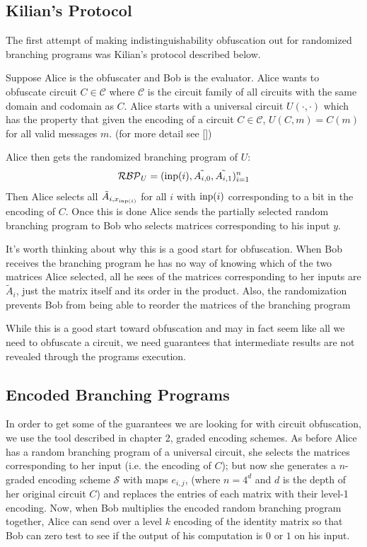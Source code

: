 \documentclass[12pt,twoside]{reedthesis}
\begin{document}
     \subsection{Kilian's Protocol}
     The first attempt of making indistinguishability obfuscation out for randomized branching programs was Kilian's protocol described below. 
     \par Suppose Alice is the obfuscater and Bob is the evaluator. Alice wants to obfuscate circuit $C\in \mathcal{C}$ where $\mathcal{C}$ is the circuit family of all circuits with the same domain and codomain as $C$. Alice starts with a universal circuit $U(\cdot, \cdot)$ which has the property that given the encoding of a circuit $C \in \mathcal{C}$, $U(C,m) = C(m)$ for all valid messages $m$. (for more detail see [\cite{Kilian:1988:FCO:62212.62215}])
     \par Alice then gets the randomized branching program of $U$:
     $$\mathcal{RBP}_U = (\text{inp}(i),\tilde{A_{i,0}},\tilde{A_{i,1}})_{i=1}^n$$
     Then Alice selects all $\tilde{A}_{i,x_{\text{inp}(i)}}$ for all $i$ with $\text{inp}(i)$ corresponding to a bit in the encoding of $C$. Once this is done Alice sends the partially selected random branching program to Bob who selects matrices corresponding to his input $y$. 
     \par It's worth thinking about why this is a good start for obfuscation. When Bob receives the branching program he has no way of knowing which of the two matrices Alice selected, all he sees of the matrices corresponding to her inputs are $\tilde{A}_i$, just the matrix itself and its order in the product. Also, the randomization prevents Bob from being able to reorder the matrices of the branching program 
     \par While this is a good start toward obfuscation and may in fact seem like all we need to obfuscate a circuit, we need guarantees that intermediate results are not revealed through the programs execution. 
    
    \subsection{Encoded Branching Programs}
    
    \par In order to get some of the guarantees we are looking for with circuit obfuscation, we use the tool described in chapter 2, graded encoding schemes. As before Alice has a random branching program of a universal circuit, she selects the matrices corresponding to her input (i.e. the encoding of $C$); but now she generates a $n$-graded encoding scheme $\mathcal{S}$ with maps $e_{i,j}$, (where $n= 4^d$ and $d$ is the depth of her original circuit $C$) and replaces the entries of each matrix with their level-1 encoding. Now, when Bob multiplies the encoded random branching program together, Alice can send over a level $k$ encoding of the identity matrix so that Bob can zero test to see if the output of his computation is $0$ or $1$ on his input.
    
\end{document}
